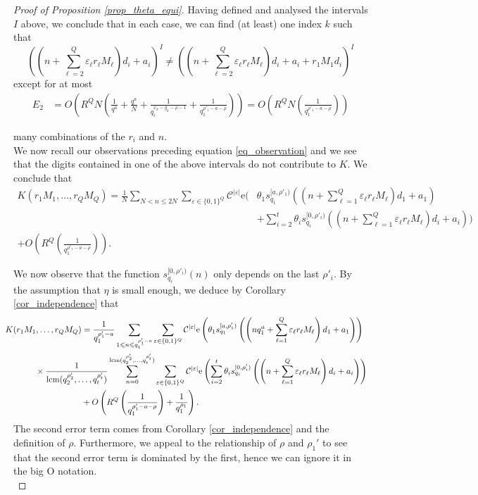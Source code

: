\documentclass[12pt]{amsart}
\renewcommand{\leq}{\leqslant}
\DeclareMathOperator{\lcm}{lcm}
\theoremstyle{definition}
\numberwithin{equation}{section}
\newcommand\e{\mathrm{e}}
\numberwithin{equation}{section}
\begin{document}
\begin{proof}[Proof of Proposition \ref{prop_theta_equi}]
	Having defined and analysed the intervals $I$ above, we conclude that in each case, we can find (at least) one index $k$ such that
	\[
		\left(\left(n+\sum_{\ell = 2}^{Q}\varepsilon_{\ell}r_{\ell}M_{\ell}\right)d_i+a_i\right)^{I}
			\neq
		\left(\left(n+\sum_{\ell = 2}^{Q}\varepsilon_{\ell}r_{\ell}M_{\ell}\right)d_i+a_i+r_1M_1d_i\right)^{I}
	\]
	except for at most
	\begin{align*}
		E_2 &= O\left(R^QN\left(\frac{1}{q^a}+\frac{q^a}{N}+\frac{1}{q_i^{x_k-y_k-\rho-1}}+\frac{1}{q_1^{\rho'_1-a-\rho}}\right)\right)= O\left(R^QN\left(\frac{1}{q_1^{\rho'_1-a-\rho}}\right)\right)
	\end{align*}
		
	many combinations of the $r_i$ and $n$.\\
	
	We now recall our observations preceding equation \eqref{eq_observation} and we see that the digits contained in one of the above intervals do not contribute to $K$. We conclude that
	\begin{align*}
		K(r_1M_1,\dots, r_QM_Q) = \frac 1N \sum_{N<n\leq 2N} \sum_{\varepsilon\in \{0,1\}^Q}\mathcal{C}^{|\varepsilon|}
		\e\Bigg(&\theta_1 s_{q_1}^{[a, \rho'_1)}\left(\left(n+\sum_{\ell = 1}^{Q} \varepsilon_{\ell}r_{\ell}M_{\ell}\right)d_1 			+a_1\right)\\
			&+\sum_{i=2}^{t}\theta_i s_{q_i}^{[0, \rho'_i)} \left(\left(n+\sum_{\ell = 1}^{Q} \varepsilon_{\ell}r_{\ell}M_{\ell}\right)d_i+a_i\right)\Bigg)\\
		+ O\left(R^Q\left(\frac{1}{q_1^{\rho'_1-a-\rho}}\right)\right).&
	\end{align*}
	
	We now observe that the function $s_{q_i}^{[0, \rho'_i)}(n)$ only depends on the last  ${\rho'_i}$. By the assumption that $\eta$ is small enough, we deduce by Corollary \ref{cor_independence} that 
	\begin{align*}
		\hspace{-10pt}K(r_1M_1,\dots, r_QM_{Q}) &= \frac 1{q_1^{\rho'_1-a}} \sum_{1\leq n \leq q_1^{\rho'_1-a}} \sum_{\varepsilon\in \{0,1\}^Q}\mathcal{C}^{|\varepsilon|}
		\e\left(\theta_1 s_{q_1}^{[a,\rho'_1)}\left(\left(nq_1^{a}+\sum_{\ell=1}^{Q}\varepsilon_{\ell}r_{\ell}M_{\ell}\right)d_1 +a_1\right)\right)\\ 
		&\hspace{-55pt}\times \frac 1{\lcm(q_2^{\rho'_2},\dots,q_t^{\rho'_t})} \sum_{n=0}^{\lcm(q_2^{\rho'_2},\dots,q_t^{\rho'_t})} \sum_{\varepsilon\in \{0,1\}^Q}\mathcal{C}^{|\varepsilon|}
		\e\left(\sum_{i=2}^{t}\theta_i s_{q_i}^{[0,\rho'_i)}\left(\left(n+\sum_{\ell=1}^{Q}\varepsilon_{\ell}r_{\ell}M_{\ell}\right)d_i +a_i\right)\right)\\
		& + O\left(R^Q\left(\frac{1}{q_1^{\rho_1'-a-\rho}}\right) +  \frac{1}{q_1^{\rho_1}}\right).
	\end{align*}
	The second error term comes from Corollary \ref{cor_independence} and the definition of $\rho$. Furthermore, we appeal to the relationship of $\rho$ and $\rho_1'$ to see that the second error term is dominated by the first, hence we can ignore it in the big $\mathrm{O}$ notation.\\
	

\end{proof}
\end{document}
